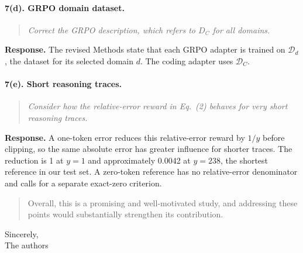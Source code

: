 \documentclass[11pt]{article}
\begin{document}
\paragraph{7(d). GRPO domain dataset.}
\begin{quote}\small\itshape Correct the GRPO description, which refers to \(D_C\) for all domains.\end{quote}
\textbf{Response.} The revised Methods state that each GRPO adapter is trained on \(\mathcal D_d\), the dataset for its selected domain \(d\). The coding adapter uses \(\mathcal D_C\).

\paragraph{7(e). Short reasoning traces.}
\begin{quote}\small\itshape Consider how the relative-error reward in Eq.\ (2) behaves for very short reasoning traces.\end{quote}
\textbf{Response.} A one-token error reduces this relative-error reward by \(1/y\) before clipping, so the same absolute error has greater influence for shorter traces. The reduction is 1 at \(y=1\) and approximately 0.0042 at \(y=238\), the shortest reference in our test set. A zero-token reference has no relative-error denominator and calls for a separate exact-zero criterion.

\begin{quote}\small
Overall, this is a promising and well-motivated study, and addressing these points would substantially strengthen its contribution.
\end{quote}

Sincerely,\\
The authors
\end{document}
